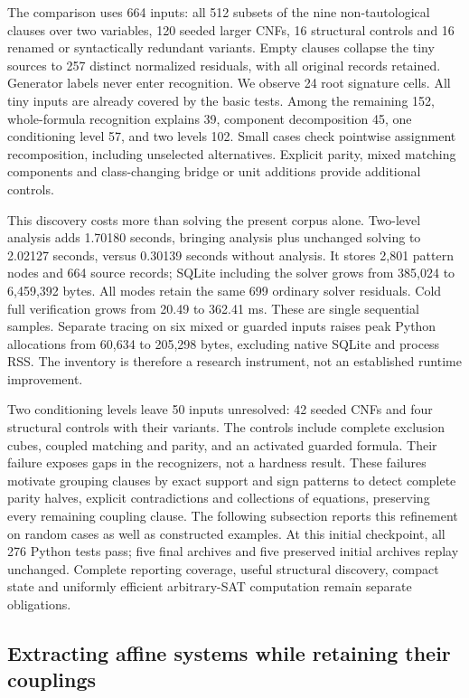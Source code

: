 \documentclass[11pt,a4paper]{article}
\numberwithin{equation}{section}
\theoremstyle{plain}
\theoremstyle{definition}
\theoremstyle{remark}
\begin{document}
The comparison uses 664 inputs: all 512 subsets of the nine non-tautological clauses over two variables, 120 seeded larger CNFs, 16 structural controls and 16 renamed or syntactically redundant variants. Empty clauses collapse the tiny sources to 257 distinct normalized residuals, with all original records retained. Generator labels never enter recognition. We observe 24 root signature cells. All tiny inputs are already covered by the basic tests. Among the remaining 152, whole-formula recognition explains 39, component decomposition 45, one conditioning level 57, and two levels 102. Small cases check pointwise assignment recomposition, including unselected alternatives. Explicit parity, mixed matching components and class-changing bridge or unit additions provide additional controls.

This discovery costs more than solving the present corpus alone. Two-level analysis adds 1.70180 seconds, bringing analysis plus unchanged solving to 2.02127 seconds, versus 0.30139 seconds without analysis. It stores 2,801 pattern nodes and 664 source records; SQLite including the solver grows from 385,024 to 6,459,392 bytes. All modes retain the same 699 ordinary solver residuals. Cold full verification grows from 20.49 to 362.41 ms. These are single sequential samples. Separate tracing on six mixed or guarded inputs raises peak Python allocations from 60,634 to 205,298 bytes, excluding native SQLite and process RSS. The inventory is therefore a research instrument, not an established runtime improvement.

Two conditioning levels leave 50 inputs unresolved: 42 seeded CNFs and four structural controls with their variants. The controls include complete exclusion cubes, coupled matching and parity, and an activated guarded formula. Their failure exposes gaps in the recognizers, not a hardness result. These failures motivate grouping clauses by exact support and sign patterns to detect complete parity halves, explicit contradictions and collections of equations, preserving every remaining coupling clause. The following subsection reports this refinement on random cases as well as constructed examples. At this initial checkpoint, all 276 Python tests pass; five final archives and five preserved initial archives replay unchanged. Complete reporting coverage, useful structural discovery, compact state and uniformly efficient arbitrary-SAT computation remain separate obligations.

\subsection{Extracting affine systems while retaining their couplings}
\label{sec:affine-pattern-extraction}
\end{document}
